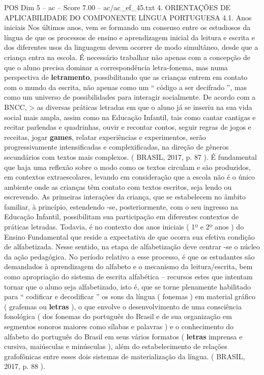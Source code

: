 \begin{textsample}{POS Dim 5 – ac – Score 7.00 – ac/ac\_ef\_45.txt}  \label{ex:f5_pos_125}
4.
ORIENTAÇÕES DE APLICABILIDADE DO COMPONENTE LÍNGUA PORTUGUESA 4.1.
Anos iniciais Nos últimos anos, vem se formando um consenso entre os estudiosos da língua de que os processos de ensino e aprendizagem inicial da leitura e escrita e dos diferentes usos da linguagem devem ocorrer de modo simultâneo, desde que a criança entra na escola.
É necessário trabalhar não apenas com a concepção de que o aluno precisa dominar a correspondência letra-fonema, mas numa perspectiva de \textbf{letramento}, possibilitando que as crianças entrem em contato com o mundo da escrita, não apenas como um “ código a ser decifrado ”, mas como um universo de possibilidades para interagir socialmente.
De acordo com a BNCC, > as diversas práticas letradas em que o aluno já se inseriu na sua vida social mais ampla, assim como na Educação Infantil, tais como cantar cantigas e recitar parlendas e quadrinhas, ouvir e recontar contos, seguir regras de jogos e receitas, jogar \textbf{games}, relatar experiências e experimentos, serão progressivamente intensificadas e complexificadas, na direção de gêneros secundários com textos mais complexos. ( BRASIL, 2017, p. 87 ).
É fundamental que haja uma reflexão sobre o modo como os textos circulam e são produzidos, em contextos extraescolares, levando em consideração que a escola não é o único ambiente onde as crianças têm contato com textos escritos, seja lendo ou escrevendo.
As primeiras interações da criança, que se estabelecem no âmbito familiar, à princípio, estendendo -se, posteriormente, com o seu ingresso na Educação Infantil, possibilitam sua participação em diferentes contextos de práticas letradas.
Todavia, é no contexto dos anos iniciais ( 1º e 2º anos ) do Ensino Fundamental que reside a expectativa de que ocorra sua efetiva condição de alfabetizada.
Nesse sentido, na etapa de alfabetização deve centrar -se o núcleo da ação pedagógica.
No período relativo a esse processo, é que os estudantes são demandados à aprendizagem do alfabeto e o mecanismo da leitura/escrita, bem como apropriação do sistema de escrita alfabética – recursos estes que intentam tornar que o aluno seja alfabetizado, isto é, que se torne plenamente habilitado para “ codificar e decodificar ” os sons da língua ( fonemas ) em material gráfico ( grafemas ou \textbf{letras} ), o que envolve o desenvolvimento de uma consciência fonológica ( dos fonemas do português do Brasil e de sua organização em segmentos sonoros maiores como sílabas e palavras ) e o conhecimento do alfabeto do português do Brasil em seus vários formatos ( \textbf{letras} imprensa e cursiva, maiúsculas e minúsculas ), além do estabelecimento de relações grafofônicas entre esses dois sistemas de materialização da língua. ( BRASIL, 2017, p. 88 ).

\end{textsample}
